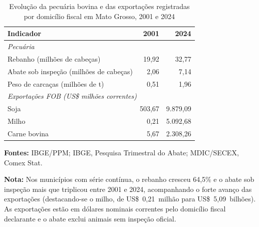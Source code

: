 \begin{table}[htbp]
\centering
\footnotesize
\captionstyle{\centering}
\normalcaption
\caption{Evolução da pecuária bovina e das exportações registradas por domicílio fiscal em Mato Grosso, 2001 e 2024}
\label{tab:h1-oferta-contexto}
\begin{tabular}{lrr}
\toprule
Indicador & 2001 & 2024 \\
\midrule
\multicolumn{3}{l}{\textit{Pecuária}} \\
Rebanho (milhões de cabeças) & 19,92 & 32,77 \\
Abate sob inspeção (milhões de cabeças) & 2,06 & 7,14 \\
Peso de carcaças (milhões de t) & 0,51 & 1,96 \\
\midrule
\multicolumn{3}{l}{\textit{Exportações FOB (US\$ milhões correntes)}} \\
Soja & 503,67 & 9.879,09 \\
Milho & 0,21 & 5.092,68 \\
Carne bovina & 5,67 & 2.308,26 \\
\bottomrule
\end{tabular}
\par\smallskip\begin{minipage}{\textwidth}\footnotesize
\SingleSpacing
\noindent\textbf{Fontes:} IBGE/PPM; IBGE, Pesquisa Trimestral do Abate; MDIC/SECEX, Comex Stat.\par\medskip
\noindent\textbf{Nota:} Nos municípios com série contínua, o rebanho cresceu 64,5\% e o abate sob inspeção mais que triplicou entre 2001 e 2024, acompanhando o forte avanço das exportações (destacando-se o milho, de US\$~0,21~milhão para US\$~5,09~bilhões). As exportações estão em dólares nominais correntes pelo domicílio fiscal declarante e o abate exclui animais sem inspeção oficial.
\end{minipage}
\end{table}
